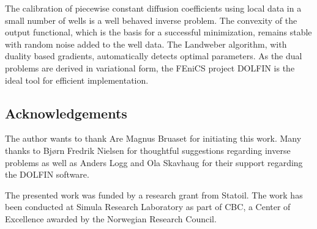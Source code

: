 The calibration of piecewise constant diffusion coefficients using
local data in a small number of wells is a well behaved inverse
problem.  The convexity of the output functional, which is the basis
for a successful minimization, remains stable with random noise added
to the well data.  The Landweber algorithm, with duality based
gradients, automatically detects optimal parameters.  As the dual
problems are derived in variational form, the FEniCS project DOLFIN is
the ideal tool for efficient implementation.

\subsection*{Acknowledgements}

The author wants to thank Are Magnus Bruaset for initiating this work.
Many thanks to Bj{\o}rn Fredrik Nielsen for thoughtful suggestions
regarding inverse problems as well as Anders Logg and Ola Skavhaug for
their support regarding the DOLFIN software.

The presented work was funded by a research grant from Statoil.  The
work has been conducted at Simula Research Laboratory as part of CBC,
a Center of Excellence awarded by the Norwegian Research Council.
